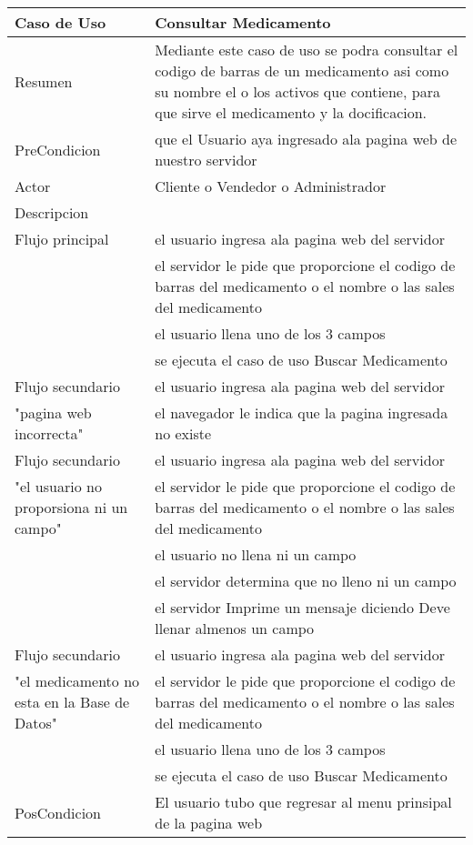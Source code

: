 \documentclass{book}
\begin{document}
	\begin{table}[H]
		\centering
		\begin{tabular}{p{3cm} p{11cm}}
			\hline
				Caso de Uso & Consultar Medicamento\\
			\hline 
				Resumen &  Mediante este caso de uso se podra consultar el codigo de barras de un medicamento asi como su nombre el o los activos que contiene, para que sirve el medicamento y la docificacion.\\
			\hline
				PreCondicion&que el Usuario aya ingresado ala pagina web de nuestro servidor\\
			\hline
				Actor & Cliente o Vendedor o Administrador\\
			\hline
				Descripcion&\\
 				Flujo principal&
					el usuario ingresa ala pagina web del servidor
					\\&el servidor le pide que proporcione el codigo de barras del medicamento o el nombre o las sales del medicamento
					\\&el usuario llena uno de los 3 campos
					\\&se ejecuta el caso de uso Buscar Medicamento\\
			\hline
				Flujo secundario & el usuario ingresa ala pagina web del servidor\\
				"pagina web incorrecta" & el navegador le indica que la pagina ingresada no existe\\
			\hline
				Flujo secundario & el usuario ingresa ala pagina web del servidor\\
				"el usuario no proporsiona ni un campo" & el servidor le pide que proporcione el codigo de barras del medicamento o el nombre o las sales del medicamento
					\\&el usuario no llena ni un campo
					\\&el servidor determina que no lleno ni un campo
					\\&el servidor Imprime un mensaje diciendo Deve llenar almenos un campo\\
			\hline
				Flujo secundario & el usuario ingresa ala pagina web del servidor\\
				"el medicamento no esta en la Base de Datos" & el servidor le pide que proporcione el codigo de barras del medicamento o el nombre o las sales del medicamento
					\\&el usuario llena uno de los 3 campos
					\\&se ejecuta el caso de uso Buscar Medicamento\\
			\hline
				PosCondicion&El usuario tubo que regresar al menu prinsipal de la pagina web\\
			\hline
		\end{tabular}
	\end{table}
\end{document}
